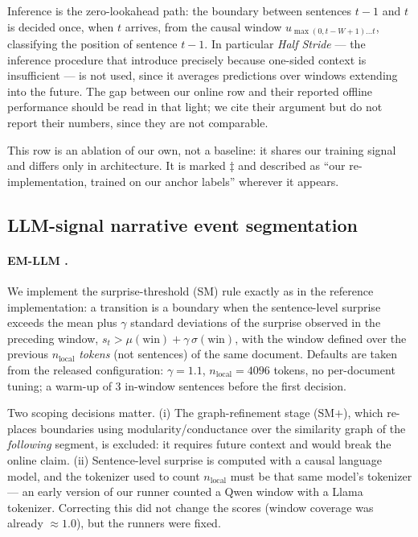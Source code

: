 Inference is the zero-lookahead path: the boundary between sentences $t-1$ and
$t$ is decided once, when $t$ arrives, from the causal window
$u_{\max(0,t-W+1)\dots t}$, classifying the position of sentence $t-1$. In
particular \emph{Half Stride} --- the inference procedure that
\citet{zehe2025assessing} introduce precisely because one-sided context is
insufficient --- is not used, since it averages predictions over windows
extending into the future. The gap between our online row and their reported
offline performance should be read in that light; we cite their argument but do
not report their numbers, since they are not comparable.

This row is an ablation of our own, not a baseline: it shares our training
signal and differs only in architecture. It is marked $\ddagger$ and described
as ``our re-implementation, trained on our anchor labels'' wherever it appears.

\subsection{LLM-signal narrative event segmentation}
\label{app:baselines-llm}

\paragraph{EM-LLM \citep{fountas2025human}.}
We implement the surprise-threshold (SM) rule exactly as in the reference
implementation: a transition is a boundary when the sentence-level surprise
exceeds the mean plus $\gamma$ standard deviations of the surprise observed in
the preceding window,
$s_t > \mu(\text{win}) + \gamma\,\sigma(\text{win})$, with the window defined
over the previous $n_{\text{local}}$ \emph{tokens} (not sentences) of the same
document. Defaults are taken from the released configuration:
$\gamma = 1.1$, $n_{\text{local}} = 4096$ tokens, no per-document tuning; a
warm-up of 3 in-window sentences before the first decision.

Two scoping decisions matter. (i) The graph-refinement stage (SM$+$), which
re-places boundaries using modularity/conductance over the similarity graph of
the \emph{following} segment, is excluded: it requires future context and would
break the online claim. (ii) Sentence-level surprise is computed with a causal
language model, and the tokenizer used to count $n_{\text{local}}$ must be that
same model's tokenizer --- an early version of our runner counted a Qwen window
with a Llama tokenizer. Correcting this did not change the scores (window
coverage was already $\approx 1.0$), but the runners were fixed.

